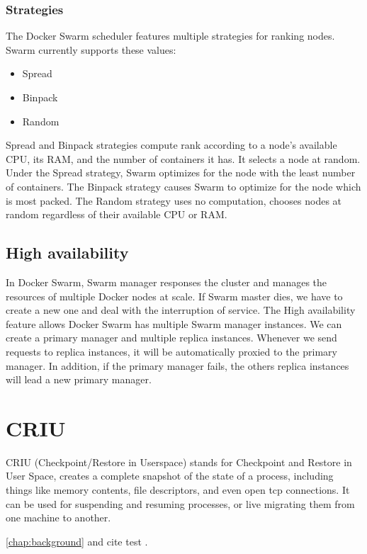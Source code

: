\subsubsection{Strategies}
The Docker Swarm scheduler features multiple strategies for ranking nodes. Swarm currently supports these values:
\begin{itemize}
    \item Spread
    \item Binpack
    \item Random
\end{itemize}
Spread and Binpack strategies compute rank according to a node’s available CPU, its RAM, and the number of containers it has. It selects a node at random. Under the Spread strategy, Swarm optimizes for the node with the least number of containers. The Binpack strategy causes Swarm to optimize for the node which is most packed. The Random strategy uses no computation, chooses nodes at random regardless of their available CPU or RAM.

\subsection{High availability}
In Docker Swarm, Swarm manager responses the cluster and manages the resources of multiple Docker nodes at scale. If Swarm master dies, we have to create a new one and deal with the interruption of service.
The High availability feature allows Docker Swarm has multiple Swarm manager instances. We can create a primary manager and multiple replica instances. Whenever we send requests to replica instances, it will be automatically proxied to the primary manager. In addition, if the primary manager fails, the others replica instances will lead a new primary manager.

\section{CRIU}
CRIU \cite{CRIU} (Checkpoint/Restore in Userspace) stands for Checkpoint and Restore in User Space, creates a complete snapshot of the state of a process, including things like memory contents, file descriptors, and even open tcp connections. It can be used for suspending and resuming processes, or live migrating them from one machine to another.

\ref{chap:background} and cite test \cite{Sohi:1995:MP:225830.224451, Hammond:1998:DSS:291069.291020, grinberg2009parallel}.